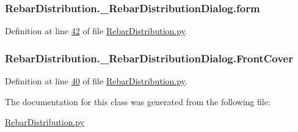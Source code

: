 \subsubsection[{\texorpdfstring{form}{form}}]{\setlength{\rightskip}{0pt plus 5cm}Rebar\+Distribution.\+\_\+\+Rebar\+Distribution\+Dialog.\+form}\hypertarget{classRebarDistribution_1_1__RebarDistributionDialog_a0ef0abff2fac018edc31389739ce284a}{}\label{classRebarDistribution_1_1__RebarDistributionDialog_a0ef0abff2fac018edc31389739ce284a}


Definition at line \hyperlink{RebarDistribution_8py_source_l00042}{42} of file \hyperlink{RebarDistribution_8py_source}{Rebar\+Distribution.\+py}.

\subsubsection[{\texorpdfstring{Front\+Cover}{FrontCover}}]{\setlength{\rightskip}{0pt plus 5cm}Rebar\+Distribution.\+\_\+\+Rebar\+Distribution\+Dialog.\+Front\+Cover}\hypertarget{classRebarDistribution_1_1__RebarDistributionDialog_aeda0fd1b138f0b5f3b79d5c6e622b650}{}\label{classRebarDistribution_1_1__RebarDistributionDialog_aeda0fd1b138f0b5f3b79d5c6e622b650}


Definition at line \hyperlink{RebarDistribution_8py_source_l00040}{40} of file \hyperlink{RebarDistribution_8py_source}{Rebar\+Distribution.\+py}.



The documentation for this class was generated from the following file\+:\begin{DoxyCompactItemize}
\item 
\hyperlink{RebarDistribution_8py}{Rebar\+Distribution.\+py}\end{DoxyCompactItemize}
